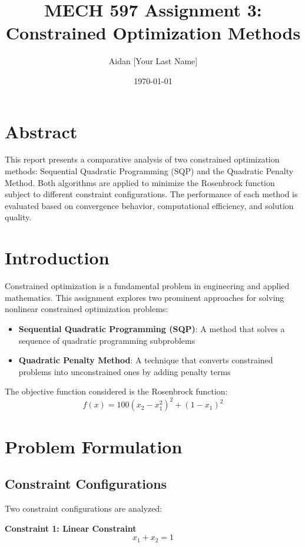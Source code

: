 \documentclass[11pt,a4paper]{article}
\title{\textbf{MECH 597 Assignment 3: Constrained Optimization Methods}}
\author{Aidan [Your Last Name]}
\date{\today}
\begin{document}
\maketitle

\section{Abstract}
This report presents a comparative analysis of two constrained optimization methods: Sequential Quadratic Programming (SQP) and the Quadratic Penalty Method. Both algorithms are applied to minimize the Rosenbrock function subject to different constraint configurations. The performance of each method is evaluated based on convergence behavior, computational efficiency, and solution quality.

\section{Introduction}
Constrained optimization is a fundamental problem in engineering and applied mathematics. This assignment explores two prominent approaches for solving nonlinear constrained optimization problems:

\begin{itemize}
    \item \textbf{Sequential Quadratic Programming (SQP)}: A method that solves a sequence of quadratic programming subproblems
    \item \textbf{Quadratic Penalty Method}: A technique that converts constrained problems into unconstrained ones by adding penalty terms
\end{itemize}

The objective function considered is the Rosenbrock function:
\begin{equation}
f(x) = 100(x_2 - x_1^2)^2 + (1 - x_1)^2
\end{equation}

\section{Problem Formulation}

\subsection{Constraint Configurations}
Two constraint configurations are analyzed:

\textbf{Constraint 1: Linear Constraint}
\begin{equation}
x_1 + x_2 = 1
\end{equation}
\end{document}
